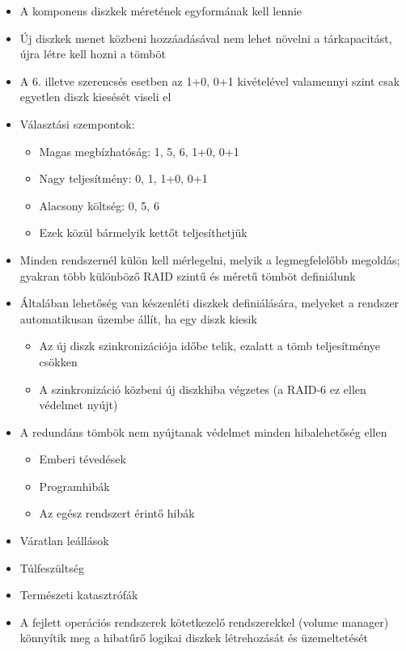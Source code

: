 \documentclass[tikz,12pt,margin=0px]{article}
\begin{document}
\begin{itemize}[topsep=8pt,itemsep=4pt,partopsep=4pt, parsep=4pt]
        \item A komponens diszkek méretének egyformának kell lennie
        \item Új diszkek menet közbeni hozzáadásával nem lehet növelni a tárkapacitást, újra létre kell hozni a tömböt
        \item A 6. illetve szerencsés esetben az 1+0, 0+1 kivételével valamennyi szint csak egyetlen diszk kiesését viseli el
        \item Választási szempontok:
        \begin{itemize}
            \item Magas megbízhatóság: 1, 5, 6, 1+0, 0+1
            \item Nagy teljesítmény: 0, 1, 1+0, 0+1
            \item Alacsony költség: 0, 5, 6
            \item Ezek közül bármelyik kettőt teljesíthetjük
        \end{itemize}
        \item Minden rendszernél külön kell mérlegelni, melyik a legmegfelelőbb megoldás; gyakran több különböző RAID szintű és méretű tömböt definiálunk
        \item Általában lehetőség van készenléti diszkek definiálására, melyeket a rendszer automatikusan üzembe állít, ha egy diszk kiesik
        \begin{itemize}
            \item Az új diszk szinkronizációja időbe telik, ezalatt a tömb teljesítménye csökken
            \item A szinkronizáció közbeni új diszkhiba végzetes (a RAID-6 ez ellen védelmet nyújt)
        \end{itemize}
        \item A redundáns tömbök nem nyújtanak védelmet minden hibalehetőség ellen
        \begin{itemize}
          \item Emberi tévedések
          \item Programhibák
          \item Az egész rendszert érintő hibák
        \end{itemize}
        \item Váratlan leállások
        \item Túlfeszültség
        \item Természeti katasztrófák
        \item A fejlett operációs rendszerek kötetkezelő rendszerekkel (volume manager) könnyítik meg a hibatűrő logikai diszkek létrehozását és üzemeltetését

\end{itemize}
\end{document}
